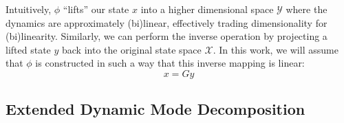 \documentclass{article}
\begin{document}
Intuitively, $\phi$ ``lifts'' our state $x$ into a higher dimensional space $\mathcal{Y}$
where the dynamics are approximately (bi)linear, effectively trading dimensionality for
(bi)linearity. Similarly, we can perform the inverse operation by projecting a lifted state
$y$ back into the original state space $\mathcal{X}$. In this work, we will assume that
$\phi$ is constructed in such a way that this inverse mapping is linear:
\begin{equation}
	x = G y
\end{equation}


\subsection{Extended Dynamic Mode Decomposition} \label{sec:edmd}

\end{document}
